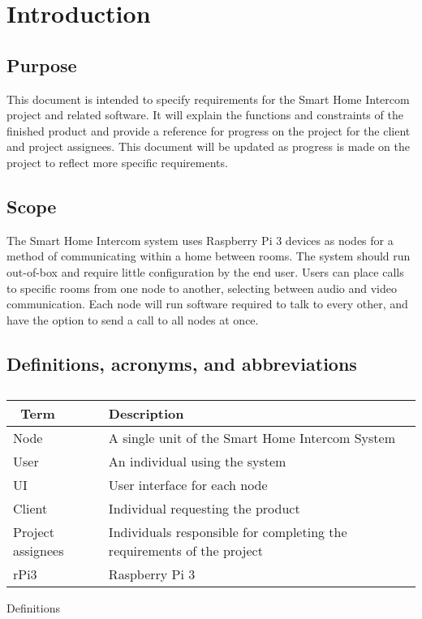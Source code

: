 \documentclass[onecolumn, draftclsnofoot,10pt, compsoc]{IEEEtran}
\begin{document}
\section{Introduction}

\subsection{Purpose}
This document is intended to specify requirements for the Smart Home Intercom project and related software. It will explain the functions and constraints of the finished product and provide a reference for progress on the project for the client and project assignees. This document will be updated as progress is made on the project to reflect more specific requirements. 

\subsection{Scope}
The Smart Home Intercom system uses Raspberry Pi 3 devices as nodes for a method of communicating within a home between rooms. The system should run out-of-box and require little configuration by the end user. Users can place calls to specific rooms from one node to another, selecting between audio and video communication.  Each node will run software required to talk to every other, and have the option to send a call to all nodes at once. 

\subsection{Definitions, acronyms, and abbreviations}
\begin{table}[!htbp]
\centering
\caption{}
\begin{tabular}{| l | l |}
 \hline
 \
 Term & Description \\ \hline
 Node & A single unit of the Smart Home Intercom System\\ \hline
 User & An individual using the system\\ \hline
 UI & User interface for each node\\ \hline
 Client & Individual requesting the product\\ \hline
 Project assignees & Individuals responsible for completing the requirements of the project\\ \hline
 rPi3 & Raspberry Pi 3\\ \hline
\end{tabular}
\end{table}
\centerline {Definitions}
\end{document}
